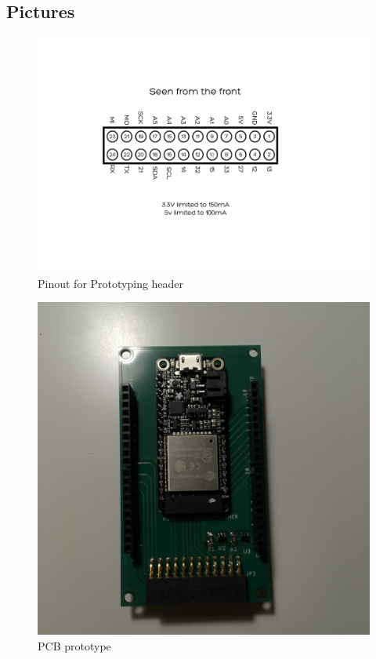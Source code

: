 \documentclass{article}
\begin{document}
 \subsection{Pictures}
 \begin{figure}[H]
  	\centering
  	\includegraphics[width=1\linewidth]{Untitled-2.png}
  	\caption{Pinout for Prototyping header}
 	 \label{fig: pinout}
\end{figure}
 \begin{figure}[H]
  	\centering
  	\includegraphics[width=1\linewidth]{IMG_2385.jpg}
  	\caption{PCB prototype}
 	 \label{fig: pcb3}
\end{figure}
\newpage
\end{document}
